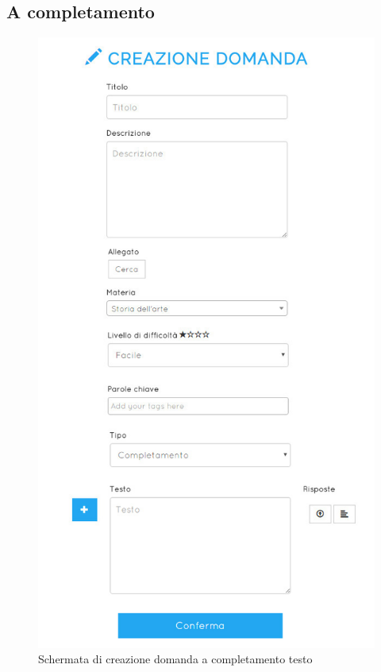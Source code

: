 \documentclass[a4paper, titlepage]{article}
\begin{document}
	 \subsection{A completamento}
	 \begin{figure}[!h]
	 	\centering
	 	\includegraphics[scale=0.33]{Img/screen_CreazioneDomandaCompletamento.png}
	 	\caption{Schermata di creazione domanda a completamento testo}
	 \end{figure}
\end{document}
